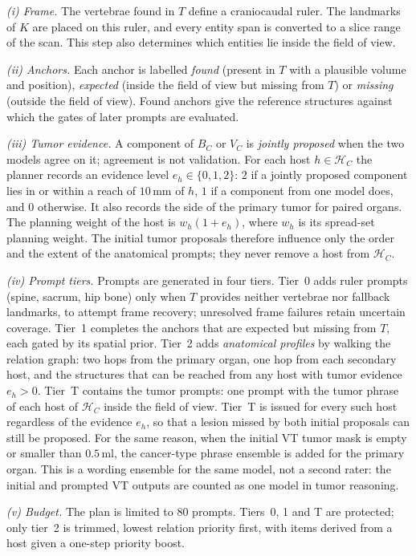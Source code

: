 \documentclass[fleqn,10pt]{olplainarticle}
\begin{document}
\emph{(i) Frame.} The vertebrae found in $T$ define a craniocaudal ruler. The landmarks of $K$ are placed on this ruler,
and every entity span is converted to a slice range of the scan. This step also determines which entities lie inside the
field of view.

\emph{(ii) Anchors.} Each anchor is labelled \emph{found} (present in $T$ with a plausible volume and position),
\emph{expected} (inside the field of view but missing from $T$) or \emph{missing} (outside the field of view). Found
anchors give the reference structures against which the gates of later prompts are evaluated.

\emph{(iii) Tumor evidence.} A component of $B_C$ or $V_C$ is \emph{jointly proposed} when the two models agree on it; agreement is not validation. For each
host $h\in\mathcal{H}_C$ the planner records an evidence level $e_h\in\{0,1,2\}$: $2$ if a jointly proposed component lies in
or within a reach of $10$\,mm of $h$, $1$ if a component from one model does, and $0$ otherwise. It also records the
side of the primary tumor for paired organs. The planning weight of the host is $w_h(1+e_h)$, where $w_h$ is its
spread-set planning weight. The initial tumor proposals therefore influence only the order and the extent of the anatomical
prompts; they never remove a host from $\mathcal{H}_C$.

\emph{(iv) Prompt tiers.} Prompts are generated in four tiers. Tier~0 adds ruler prompts (spine, sacrum, hip bone) only
when $T$ provides neither vertebrae nor fallback landmarks, to attempt frame recovery; unresolved frame failures retain uncertain coverage. Tier~1 completes the anchors that are expected but missing from $T$, each gated by its
spatial prior. Tier~2 adds \emph{anatomical profiles} by walking the relation graph: two hops from the primary organ,
one hop from each secondary host, and the structures that can be reached from any host with tumor evidence
$e_h>0$. Tier~T contains the tumor prompts: one prompt with the tumor phrase of each host of $\mathcal{H}_C$ inside the
field of view. Tier~T is issued for every such host regardless of the evidence $e_h$, so that a lesion missed by both
initial proposals can still be proposed. For the same reason, when the initial VT tumor mask is empty or smaller than
$0.5$\,ml, the cancer-type phrase ensemble is added for the primary organ. This is a wording ensemble for the same
model, not a second rater: the initial and prompted VT outputs are counted as one model in tumor reasoning.

\emph{(v) Budget.} The plan is limited to $80$ prompts. Tiers~0, 1 and T are protected; only tier~2 is trimmed, lowest relation
priority first, with items derived from a host given a one-step priority boost.
\end{document}
